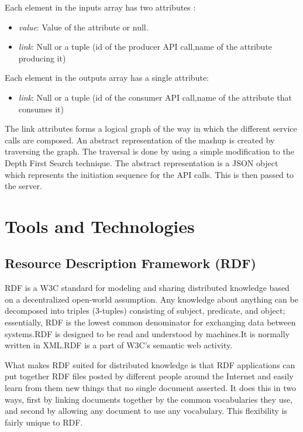 \begin{spacing}{1.5}
\begin{itemize}
Each element in the inputs array has two attributes :
\begin{itemize}
\item{\it value}: Value of the attribute or null.
\item{\it link}: Null or a tuple (id of the producer API call,name of the attribute producing it)
\end{itemize}

Each element in the outputs array has a single attribute:
\begin{itemize}
\item{\it link}: Null or a tuple (id of the consumer API call,name of the attribute that consumes it)
\end{itemize}

\end{itemize}

The link attributes forms a logical graph of the way in which the different service calls are composed. An abstract representation of the mashup is created by traversing the graph. The traversal is done by using a simple modification to the Depth First Search technique. The abstract representation is a JSON object which represents the initiation sequence for the API calls. This is then passed to the server.

\section{Tools and Technologies}

\subsection{Resource Description Framework (RDF)}
RDF is a W3C standard\cite{rdf} for modeling and sharing distributed knowledge based on a decentralized open-world assumption. Any knowledge about anything can be decomposed into triples (3-tuples) consisting of subject, predicate, and object; essentially, RDF is the lowest common denominator for exchanging data between systems.RDF is designed to be read and understood by machines.It is normally written in XML.RDF is a part of W3C's semantic web activity.

What makes RDF suited for distributed knowledge is that RDF applications can put together RDF files posted by different people around the Internet and easily learn from them new things that no single document asserted. It does this in two ways, first by linking documents together by the common vocabularies they use, and second by allowing any document to use any vocabulary. This flexibility is fairly unique to RDF.


\end{spacing}
